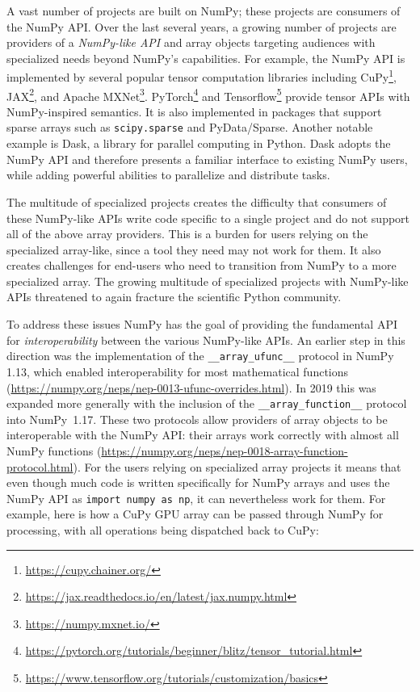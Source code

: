 \documentclass{article}
\begin{document}
A vast number of projects are built on NumPy;
these projects are consumers of the NumPy API.
Over the last several years, a growing number of projects are providers of
a \emph{NumPy-like API} and array objects targeting audiences with specialized
needs beyond NumPy's capabilities.
For example, the NumPy API is implemented by several popular tensor computation
libraries including CuPy\footnote{\url{https://cupy.chainer.org/}},
JAX\footnote{\url{https://jax.readthedocs.io/en/latest/jax.numpy.html}},
and Apache MXNet\footnote{\url{https://numpy.mxnet.io/}}.
PyTorch\footnote{\url{https://pytorch.org/tutorials/beginner/blitz/tensor\_tutorial.html}}
and Tensorflow\footnote{\url{https://www.tensorflow.org/tutorials/customization/basics}}
provide tensor APIs with NumPy-inspired semantics.
It is also implemented in packages that support sparse arrays
such as \texttt{scipy.sparse} and PyData/Sparse.
Another notable example is Dask, a library for parallel computing in
Python.  Dask adopts the NumPy API and therefore presents a familiar
interface to existing NumPy users, while adding powerful abilities to
parallelize and distribute tasks.

The multitude of specialized projects creates the difficulty that consumers
of these NumPy-like APIs write code specific to a single project and do not support
all of the above array providers.
This is a burden for users relying on the specialized array-like, since
a tool they need may not work for them.
It also creates challenges for end-users who need to transition
from NumPy to a more specialized array.
The growing multitude of specialized projects with NumPy-like APIs threatened
to again fracture the scientific Python community.

To address these issues NumPy has the goal of providing the fundamental
API for \emph{interoperability} between the various NumPy-like APIs.
An earlier step in this direction was the implementation of the
\texttt{\_\_array\_ufunc\_\_} protocol in NumPy 1.13, which enabled interoperability
for most mathematical functions (\url{https://numpy.org/neps/nep-0013-ufunc-overrides.html}).
In 2019 this was expanded more generally with the inclusion of the
\texttt{\_\_array\_function\_\_} protocol into NumPy~1.17.
These two protocols allow providers of array objects to be interoperable
with the NumPy API: their arrays work correctly with almost all NumPy
functions (\url{https://numpy.org/neps/nep-0018-array-function-protocol.html}).
For the users relying on specialized array projects it means that even though
much code is written specifically for NumPy arrays and uses the NumPy API as
\texttt{import numpy as np}, it can nevertheless work for them.
For example, here is how a CuPy GPU array can be passed through NumPy for
processing, with all operations being dispatched back to CuPy:
\end{document}
